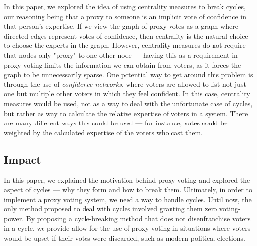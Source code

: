\documentclass[10pt]{article}
\theoremstyle{definition}
\begin{document}
In this paper, we explored the idea of using centrality measures to break cycles, our reasoning being that a proxy to someone is an implicit vote of confidence in that person's expertise. If we view the graph of proxy votes as a graph where directed edges represent votes of confidence, then centrality is the natural choice to choose the experts in the graph. However, centrality measures do not require that nodes only "proxy" to one other node --- having this as a requirement in proxy voting limits the information we can obtain from voters, as it forces the graph to be unnecessarily sparse. One potential way to get around this problem is through the use of \textit{confidence networks}, where voters are allowed to list not just one but multiple other voters in which they feel confident. In this case, centrality measures would be used, not as a way to deal with the unfortunate case of cycles, but rather as way to calculate the relative expertise of voters in a system. There are many different ways this could be used --- for instance, votes could be weighted by the calculated expertise of the voters who cast them.

\subsection{Impact}
In this paper, we explained the motivation behind proxy voting and explored the aspect of cycles --- why they form and how to break them. Ultimately, in order to implement a proxy voting system, we need a way to handle cycles. Until now, the only method proposed to deal with cycles involved granting them zero voting-power. By proposing a cycle-breaking method that does not disenfranchise voters in a cycle, we provide allow for the use of proxy voting in situations where voters would be upset if their votes were discarded, such as modern political elections.
\end{document}
